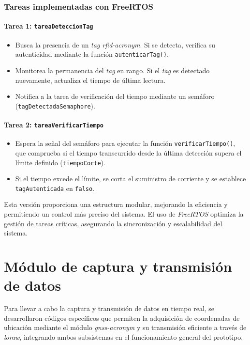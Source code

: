 \subsubsection{Tareas implementadas con FreeRTOS}

\paragraph{Tarea 1: \texttt{tareaDeteccionTag}}
\begin{itemize}
    \item Busca la presencia de un \textit{tag \acrshort{rfid-acronym}}. Si se detecta, verifica su autenticidad mediante la función \texttt{autenticarTag()}.
    \item Monitorea la permanencia del \textit{tag} en rango. Si el \textit{tag} es detectado nuevamente, actualiza el tiempo de última lectura.
    \item Notifica a la tarea de verificación del tiempo mediante un semáforo (\texttt{tagDetectadaSemaphore}).
\end{itemize}

\paragraph{Tarea 2: \texttt{tareaVerificarTiempo}}
\begin{itemize}
    \item Espera la señal del semáforo para ejecutar la función \texttt{verificarTiempo()}, que comprueba si el tiempo transcurrido desde la última detección supera el límite definido (\texttt{tiempoCorte}).
    \item Si el tiempo excede el límite, se corta el suministro de corriente y se establece \texttt{tagAutenticada} en \texttt{falso}.
\end{itemize}

Esta versión proporciona una estructura modular, mejorando la eficiencia y permitiendo un control más preciso del sistema. El uso de \textit{FreeRTOS} optimiza la gestión de tareas críticas, asegurando la sincronización y escalabilidad del sistema.


\section{Módulo de captura y transmisión de datos}

Para llevar a cabo la captura y transmisión de datos en tiempo real, se desarrollaron códigos específicos que permiten la adquisición de coordenadas de ubicación mediante el módulo \textit{\acrshort{gnss-acronym}} y su transmisión eficiente a través de \textit{\acrshort{loraw}}, integrando ambos subsistemas en el funcionamiento general del prototipo.

